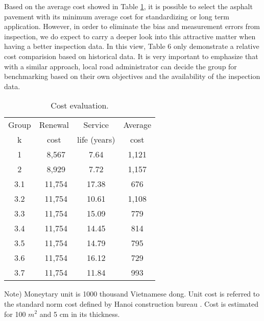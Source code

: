 Based on the average cost showed in Table \ref{table61}, it is possible to select the asphalt pavement with its minimum average cost for standardizing or long term application. However, in order to eliminate the bias and measurement errors from inspection, we do expect to carry a deeper look into this attractive matter when having a better inspection data.  In this view, Table 6 only demonstrate a relative cost comparision based on historical data. It is very important to emphasize that with a similar approach, local road administrator can decide the group for benchmarking based on their own objectives and the availability of the inspection data.
%
\begin{table}[t]
\begin{center}
\caption{Cost evaluation.}
\label{table61}
{\small
\begin{tabular}{c|c|c|c}\hline
   Group&  Renewal & Service & Average \\
      k  & cost  & life (years)  & cost \\\hline
   1 &  ~8,567 & 7.64   & 1,121 \\
   2 &  ~8,929 & 7.72    & 1,157 \\
   3.1 &  ~11,754 & 17.38   & 676 \\
   3.2 &  ~11,754 & 10.61   & 1,108 \\
   3.3 &  ~11,754 & 15.09  & 779 \\
   3.4 &  ~11,754 & 14.45   & 814 \\
   3.5 &  ~11,754 & 14.79   & 795 \\
   3.6 &  ~11,754 & 16.12   & 729 \\
   3.7 &  ~11,754 & 11.84   & 993 \\
   \hline
\end{tabular}
}
\end{center}
\footnotesize Note) Moneytary unit is 1000 thousand Vietnamese dong. Unit cost is referred to the standard norm cost defined by Hanoi construction bureau \cite{dghanoi08,dm1242}. Cost is estimated for 100 $m^2$ and 5 cm in its thickness.
\end{table}
